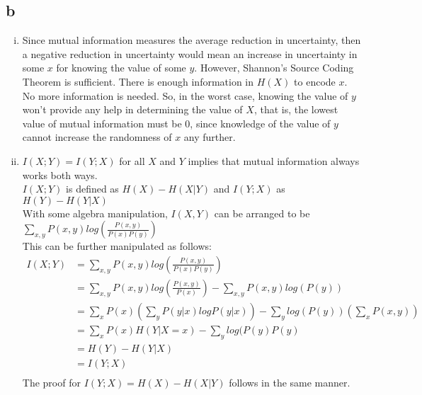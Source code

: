 \documentclass[letterpaper,notitlepage,twoside]{article}
\begin{document}
\subsection*{b}
\begin{enumerate}[(i)]
\item Since mutual information measures the average reduction in uncertainty, then a negative reduction in uncertainty would mean an increase in uncertainty in some $x$ for knowing the value of some $y$. However, Shannon's Source Coding Theorem is sufficient. There is enough information in $H(X)$ to encode $x$. No more information is needed. So, in the worst case, knowing the value of $y$ won't provide any help in determining the value of $X$, that is, the lowest value of mutual information must be 0, since knowledge of the value of $y$ cannot increase the randomness of $x$ any further.
\item $I(X ; Y) = I(Y ; X)$ for all $X$ and $Y$ implies that mutual information always works both ways. \\
$I(X;Y)$ is defined as $H(X) - H(X|Y)$ and $I(Y;X)$ as $H(Y) - H(Y|X)$ \\ 
With some algebra manipulation, $I(X,Y)$ can be arranged to be $\sum\limits_{x,y} P(x,y) log(\frac{P(x,y)}{P(x)P(y)})$ \\
This can be further manipulated as follows: \\
$\begin{aligned}
I(X;Y) &= \sum\limits_{x,y} P(x,y) log(\frac{P(x,y)}{P(x)P(y)}) \\
&= \sum\limits_{x,y} P(x,y) log(\frac{P(x,y)}{P(x)}) - \sum\limits_{x,y} P(x,y) log(P(y)) \\
&= \sum\limits_{x} P(x) (\sum\limits_{y} P(y|x) log P(y|x)) - \sum\limits_{y} log(P(y)) (\sum\limits_{x} P(x, y)) \\
&= \sum\limits_{x} P(x) H(Y|X = x) - \sum\limits_{y} log(P(y)P(y) \\
&= H(Y) - H(Y|X) \\
&= I(Y;X) \\
\end{aligned}$ \\
The proof for $I(Y;X) = H(X) - H(X|Y)$ follows in the same manner.

\end{enumerate}
\end{document}
